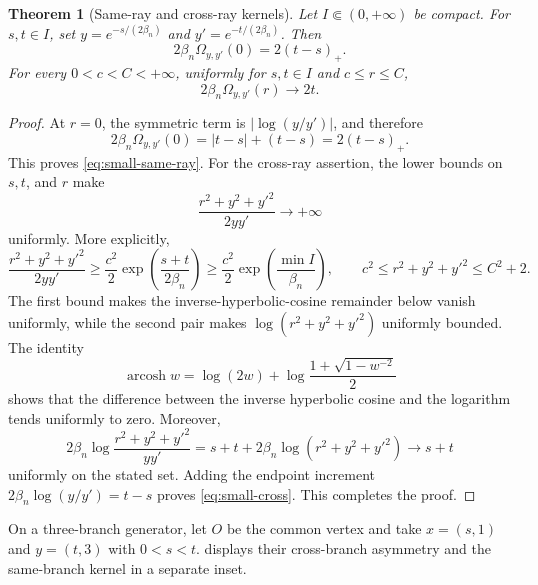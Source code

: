 \documentclass{amsart}
\numberwithin{equation}{section}
\theoremstyle{plain}
\newtheorem{theorem}{Theorem}[section]
\theoremstyle{definition}
\theoremstyle{remark}
\DeclareMathOperator{\arcosh}{arcosh}
\begin{document}
\begin{theorem}[Same-ray and cross-ray kernels]\label{thm:small-beta-kernels}
Let $I\Subset(0,+\infty)$ be compact.  For $s,t\in I$, set
$y=e^{-s/(2\beta_n)}$ and $y'=e^{-t/(2\beta_n)}$.  Then
\begin{equation}\label{eq:small-same-ray} 2\beta_n\Omega_{y,y'}(0)=2(t-s)_+. \end{equation}
For every $0<c<C<+\infty$, uniformly for $s,t\in I$ and $c\le r\le C$,
\begin{equation}\label{eq:small-cross} 2\beta_n\Omega_{y,y'}(r)\longrightarrow2t. \end{equation}
\end{theorem}

\begin{proof}
At $r=0$, the symmetric term is $|\log(y/y')|$, and therefore
\[ 2\beta_n\Omega_{y,y'}(0)=|t-s|+(t-s)=2(t-s)_+. \]
This proves \eqref{eq:small-same-ray}.  For the cross-ray assertion, the lower bounds on $s,t$, and $r$ make
\[ \frac{r^2+y^2+y'^2}{2yy'}\longrightarrow+\infty \]
uniformly.  More explicitly,
\[ \frac{r^2+y^2+y'^2}{2yy'} \ge\frac{c^2}{2}\exp\left(\frac{s+t}{2\beta_n}\right) \ge\frac{c^2}{2}\exp\left(\frac{\min I}{\beta_n}\right), \qquad c^2\le r^2+y^2+y'^2\le C^2+2. \]
The first bound makes the inverse-hyperbolic-cosine remainder below vanish uniformly, while the second pair makes $\log(r^2+y^2+y'^2)$ uniformly bounded.  The identity
\[ \arcosh w=\log(2w)+ \log\frac{1+\sqrt{1-w^{-2}}}{2} \]
shows that the difference between the inverse hyperbolic cosine and the logarithm tends uniformly to zero.  Moreover,
\[ 2\beta_n\log\frac{r^2+y^2+y'^2}{yy'} =s+t+2\beta_n\log(r^2+y^2+y'^2) \longrightarrow s+t \]
uniformly on the stated set.  Adding the endpoint increment
$2\beta_n\log(y/y')=t-s$ proves \eqref{eq:small-cross}.
	This completes the proof.
\end{proof}

On a three-branch generator, let $O$ be the common vertex and take $x=(s,1)$ and $y=(t,3)$ with $0<s<t$.   displays their cross-branch asymmetry and the same-branch kernel in a separate inset.
\end{document}
